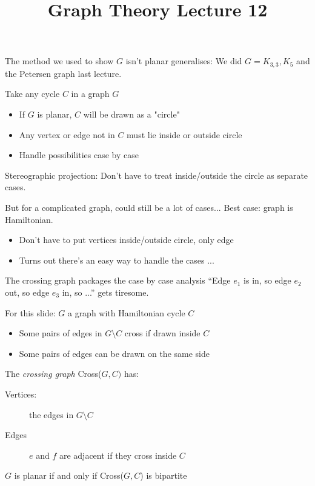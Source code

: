 \documentclass{beamer}
\title{Graph Theory Lecture 12}
\begin{document}
\begin{frame}{The method we used to show $G$ isn't planar generalises:}
We did $G=K_{3,3}, K_5$ and the Petersen graph last lecture.
  
\begin{block}{Take any cycle $C$ in a graph $G$}
\begin{itemize}
    \item If $G$ is planar, $C$ will be drawn as a "circle"
    \item Any vertex or edge not in $C$ must lie inside or outside circle
    \item Handle possibilities case by case
\end{itemize}
\end{block}

\begin{block}{Stereographic projection:}
Don't have to treat inside/outside the circle as separate cases.
\end{block}

\begin{block}{But for a complicated graph, could still be a lot of cases...}
  Best case: graph is Hamiltonian.
  \begin{itemize}
  \item Don't have to put vertices inside/outside circle, only edge
  \item Turns out there's an easy way to handle the cases ...  
  \end{itemize}
\end{block}

\end{frame}


\begin{frame}{The crossing graph packages the case by case analysis}
``Edge $e_1$ is in, so edge $e_2$ out, so edge $e_3$ in, so ...'' gets tiresome.

  \begin{block}{For this slide: $G$ a graph with Hamiltonian cycle $C$}
    \begin{itemize}
    \item Some pairs of edges in $G\setminus C$ cross if drawn inside $C$
    \item Some pairs of edges can be drawn on the same side
\end{itemize}
\end{block}
\begin{definition}
  The \emph{crossing graph} Cross($G, C)$ has:
  \begin{description}
  \item[Vertices:] the edges in $G\setminus C$
  \item[Edges] $e$ and $f$ are adjacent if they cross inside $C$
  \end{description}
  \end{definition}
\begin{theorem}
$G$ is planar if and only if Cross($G,C$) is bipartite
\end{theorem}

\end{frame}
\end{document}

